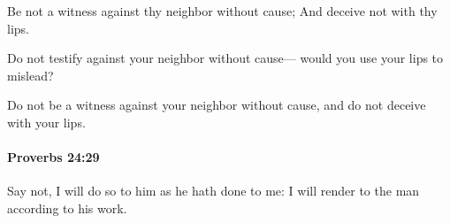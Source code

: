 			\begin{versebox}
					\item[BHS] 
					\item[ASV] Be not a witness against thy neighbor without cause; And deceive not with thy lips.
					\item[NIV] Do not testify against your neighbor without cause— would you use your lips to mislead?
					\item[NRSV] Do not be a witness against your neighbor without cause, and do not deceive with your lips.
			\end{versebox}

		\paragraph{Proverbs 24:29} %
			\label{PROVERBS-24-29}

			Say not, I will do so to him as he hath done to me: I will render to the man according to his work.

